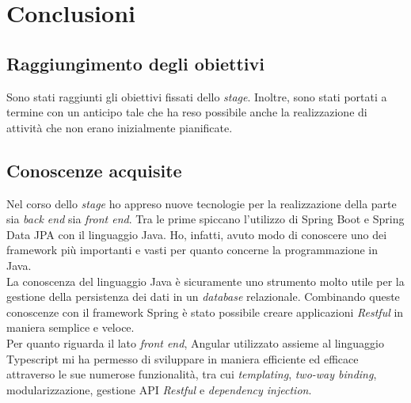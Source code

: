 
\chapter{Conclusioni}
\label{cap:conclusioni}
\section{Raggiungimento degli obiettivi}
Sono stati raggiunti gli obiettivi fissati dello \textit{stage}. Inoltre, sono
stati portati a termine con un anticipo tale che ha reso possibile anche la
realizzazione di attività che non erano inizialmente pianificate.



\section{Conoscenze acquisite}
Nel corso dello \textit{stage} ho appreso nuove tecnologie per la realizzazione
della parte sia \textit{back end} sia \textit{front end}. Tra le prime spiccano
l'utilizzo di Spring Boot e Spring Data JPA con il linguaggio Java. Ho,
infatti, avuto modo di conoscere uno  dei \gls{framework}  più importanti e
vasti per quanto concerne la programmazione in Java.\\
La conoscenza del linguaggio Java è sicuramente uno strumento molto utile per
la gestione della persistenza dei dati in un \textit{database} relazionale.
Combinando queste conoscenze con il \gls{framework} Spring è stato possibile
creare applicazioni \textit{Restful} in maniera semplice e veloce.\\
Per quanto riguarda il lato \textit{front end}, Angular utilizzato assieme al
linguaggio Typescript mi ha permesso di sviluppare in maniera efficiente ed
efficace attraverso le sue numerose funzionalità, tra cui \textit{templating},
\textit{two-way binding},
modularizzazione, gestione \gls{API} \textit{Restful} e \textit{dependency
    injection}.

